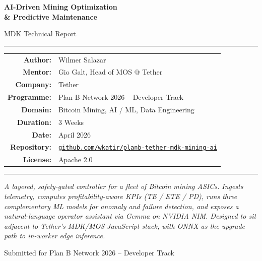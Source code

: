 \documentclass[11pt,a4paper]{article}
\begin{document}
\begin{titlepage}
    \centering
    \vspace*{2cm}

    {\Huge\bfseries AI-Driven Mining Optimization \\[0.3em] \& Predictive Maintenance \par}

    \vspace{0.6cm}
    {\Large MDK Technical Report \par}

    \vspace{2cm}
    \rule{10cm}{0.6pt}\par
    \vspace{1cm}

    \begin{tabular}{rl}
        \textbf{Author:}     & Wilmer Salazar \\[0.3em]
        \textbf{Mentor:}     & Gio Galt, Head of MOS @ Tether \\[0.3em]
        \textbf{Company:}    & Tether \\[0.3em]
        \textbf{Programme:}  & Plan B Network 2026 -- Developer Track \\[0.3em]
        \textbf{Domain:}     & Bitcoin Mining, AI / ML, Data Engineering \\[0.3em]
        \textbf{Duration:}   & 3 Weeks \\[0.3em]
        \textbf{Date:}       & April 2026 \\[0.3em]
        \textbf{Repository:} & \href{https://github.com/wkatir/planb-tether-mdk-mining-ai}{\texttt{github.com/wkatir/planb-tether-mdk-mining-ai}} \\[0.3em]
        \textbf{License:}    & Apache 2.0
    \end{tabular}

    \vspace{1.5cm}
    \rule{10cm}{0.6pt}\par
    \vspace{1.5cm}

    \begin{minipage}{0.85\textwidth}
        \centering\itshape
        A layered, safety-gated controller for a fleet of Bitcoin mining ASICs.
        Ingests telemetry, computes profitability-aware KPIs (TE / ETE / PD),
        runs three complementary ML models for anomaly and failure detection,
        and exposes a natural-language operator assistant via Gemma on
        NVIDIA NIM. Designed to sit adjacent to Tether's MDK/MOS JavaScript
        stack, with ONNX as the upgrade path to in-worker edge inference.
    \end{minipage}

    \vfill
    {\small Submitted for Plan B Network 2026 -- Developer Track}\par
\end{titlepage}
\end{document}
